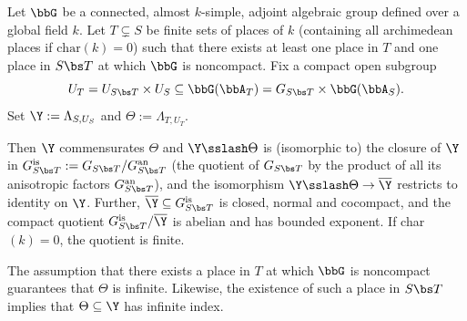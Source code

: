 \begin{prop}\label{prop:schlichting-arithmetic}
Let $\bbG$ be a connected, almost $k$-simple, adjoint algebraic group defined over a global field $k$. Let $T\subsetneq S$ be finite sets of places of $k$ (containing all archimedean places if $\mathrm{char}(k)=0$) such that there exists at least one place in $T$ and one place in $S\bs T$ at which $\bbG$ is noncompact. Fix a compact open subgroup
\[
U_T=U_{S\bs T} \times U_S\subseteq \bbG(\bbA_T)=G_{S\bs T}\times \bbG(\bbA_S).
\]
Set $\Y:=\Lambda_{S,U_S}$ and $\Theta:=\Lambda_{T,U_T}$.

Then $\Y$ commensurates $\Theta$ and $\Y\sslash\Theta$ is (isomorphic to) the closure of $\Y$ in $G_{S\bs T}^{\textup{is}}:=G_{S\bs T}/G_{S\bs T}^{\textup{an}}$ (the quotient of $G_{S\bs T}$ by the product of all its anisotropic factors $G_{S\bs T}^{\textup{an}}$), and the isomorphism $\Y\sslash\Theta\to\overline{\Y}$ restricts to identity on $\Y$. Further, $\overline{\Y}\subseteq G_{S\bs T}^{\textup{is}}$ is closed, normal and cocompact, and the compact quotient $G_{S\bs T}^{\textup{is}}/\overline{\Y}$ is abelian and has bounded exponent. If char$(k)=0$, the quotient is finite.
\end{prop}
\begin{rem}\label{rem:infty}
The assumption that there exists a place in $T$ at which $\bbG$ is noncompact guarantees that $\Theta$ is infinite. Likewise, the existence of such a place in $S\bs T$ implies that $\Theta\subseteq \Y$ has infinite index.\end{rem}

